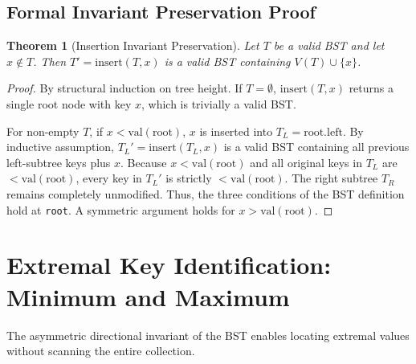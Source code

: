 \documentclass[10pt,journal,compsoc,onecolumn]{IEEEtran}
\newtheorem{theorem}{Theorem}
\begin{document}
\subsection{Formal Invariant Preservation Proof}
\begin{theorem}[Insertion Invariant Preservation]
Let $T$ be a valid BST and let $x \notin T$. Then $T' = \mathrm{insert}(T, x)$ is a valid BST containing $V(T) \cup \{x\}$.
\end{theorem}
\begin{proof}
By structural induction on tree height. If $T = \emptyset$, $\mathrm{insert}(T, x)$ returns a single root node with key $x$, which is trivially a valid BST. 

For non-empty $T$, if $x < \mathrm{val}(\mathrm{root})$, $x$ is inserted into $T_L = \mathrm{root.left}$. By inductive assumption, $T_L' = \mathrm{insert}(T_L, x)$ is a valid BST containing all previous left-subtree keys plus $x$. Because $x < \mathrm{val}(\mathrm{root})$ and all original keys in $T_L$ are $< \mathrm{val}(\mathrm{root})$, every key in $T_L'$ is strictly $< \mathrm{val}(\mathrm{root})$. The right subtree $T_R$ remains completely unmodified. Thus, the three conditions of the BST definition hold at \texttt{root}. A symmetric argument holds for $x > \mathrm{val}(\mathrm{root})$.
\end{proof}

\section{Extremal Key Identification: Minimum and Maximum}
\label{sec:extremals}

The asymmetric directional invariant of the BST enables locating extremal values without scanning the entire collection.
\end{document}
